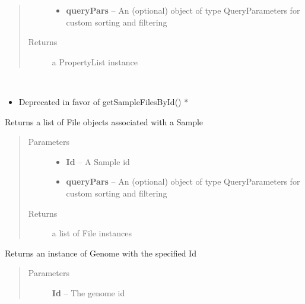 \documentclass[letterpaper,10pt,english]{sphinxmanual}
\begin{document}
\begin{fulllineitems}
\begin{fulllineitems}
\begin{quote}
\begin{description}
\begin{itemize}
\item {} 
\textbf{queryPars} -- An (optional) object of type QueryParameters for custom sorting and filtering

\end{itemize}

\item[{Returns}] \leavevmode
a PropertyList instance

\end{description}\end{quote}

\end{fulllineitems}


\begin{fulllineitems}
\label{Available modules:BaseSpacePy.api.BaseSpaceAPI.BaseSpaceAPI.getFilesBySample}~\begin{itemize}
\item {} 
Deprecated in favor of getSampleFilesById() *

\end{itemize}

Returns a list of File objects associated with a Sample
\begin{quote}\begin{description}
\item[{Parameters}] \leavevmode\begin{itemize}
\item {} 
\textbf{Id} -- A Sample id

\item {} 
\textbf{queryPars} -- An (optional) object of type QueryParameters for custom sorting and filtering

\end{itemize}

\item[{Returns}] \leavevmode
a list of File instances

\end{description}\end{quote}

\end{fulllineitems}


\begin{fulllineitems}
\label{Available modules:BaseSpacePy.api.BaseSpaceAPI.BaseSpaceAPI.getGenomeById}
Returns an instance of Genome with the specified Id
\begin{quote}\begin{description}
\item[{Parameters}] \leavevmode
\textbf{Id} -- The genome id


\end{description}
\end{quote}
\end{fulllineitems}
\end{fulllineitems}
\end{document}
